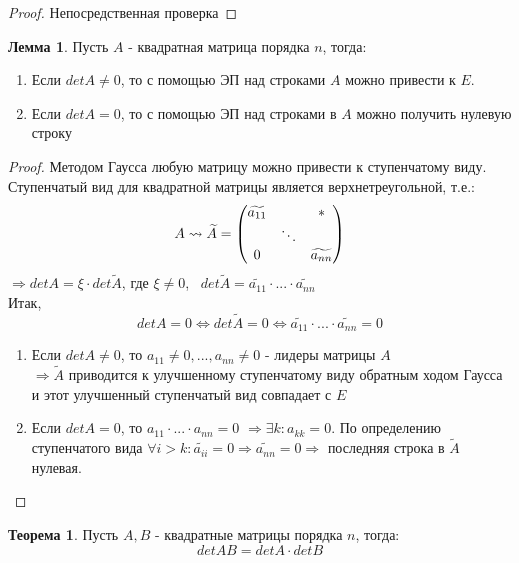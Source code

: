 \documentclass[a4paper, 12pt]{article}
\newcounter{lemcount}
\newcounter{lemcount2}
\newcounter{thcount}
\theoremstyle{definition}
\newtheorem{lemmanum2}[lemcount2]{Лемма}
\newtheorem{theoremnum}[thcount]{Теорема}
\begin{document}
  \begin{proof}
    Непосредственная проверка
  \end{proof}
  \begin{lemmanum2} \label{lemma2}
    Пусть $A$ - квадратная матрица порядка $n$, тогда:
    \begin{enumerate}
      \item Если $detA \not = 0$, то с помощью ЭП над строками $A$ можно привести к $E$. 
      \item Если $detA = 0$, то с помощью ЭП над строками в $A$ можно получить нулевую строку
    \end{enumerate}
  \end{lemmanum2} 
  \begin{proof}
    Методом Гаусса любую матрицу можно привести к ступенчатому виду. Ступенчатый вид для квадратной матрицы является верхнетреугольной, т.е.:
    $$A \leadsto \widetilde{A} = \begin{pmatrix}
      \widetilde{a_{11}} & \null & * \\
      \null & \ddots & \null \\
      0 & \null & \widetilde{a_{nn}}
    \end{pmatrix}$$  
    $\Longrightarrow detA = \xi \cdot det \widetilde{A}$, где $\xi \not = 0$, \ $det \widetilde{A} = \widetilde{a_{11}} \cdot ... \cdot \widetilde{a_{nn}}$\\
    Итак, 
    $$detA =0 \Longleftrightarrow  det \widetilde{A} = 0 \Longleftrightarrow \widetilde{a_{11}} \cdot ... \cdot \widetilde{a_{nn}} =0$$ 
    \begin{enumerate}
      \item Если $detA \not = 0$, то $a_{11} \not = 0,...,a_{nn} \not = 0$ - лидеры матрицы $A$ \\ $\Longrightarrow \widetilde{A}$  приводится к улучшенному ступенчатому виду обратным ходом Гаусса и этот улучшенный ступенчатый вид совпадает с $E$
      \item Если $detA = 0$, то $a_{11} \cdot...\cdot a_{nn} = 0$ $\Longrightarrow  \exists k: a_{kk} = 0$. По определению ступенчатого вида $\forall i > k: \widetilde{a_{ii}} = 0 \Longrightarrow \widetilde{a_{nn}} = 0 \Longrightarrow$ последняя строка в $\widetilde{A}$ нулевая.  
    \end{enumerate}
  \end{proof} 
  \begin{theoremnum}
    Пусть $A, B$ - квадратные матрицы порядка $n$, тогда: $$detAB = detA \cdot detB$$ 
  \end{theoremnum} 
\end{document}
